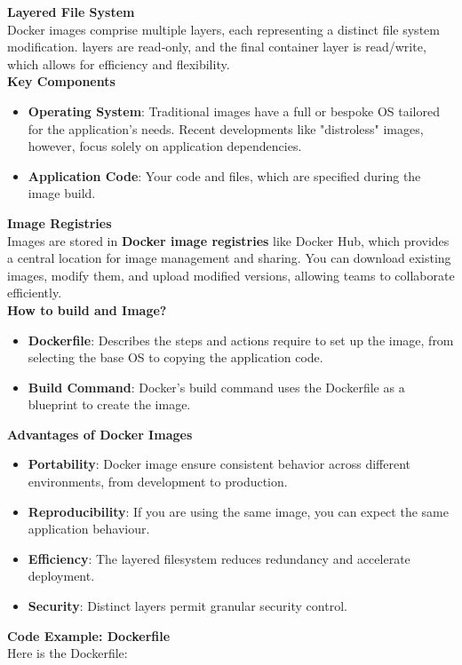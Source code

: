 \documentclass{article}
\begin{document}
\textbf{Layered File System} \\
Docker images comprise multiple layers, each representing a distinct file system modification. layers are read-only, and the final container layer is read/write, which allows for efficiency and flexibility. \\   
\textbf{Key Components} \\
\begin{itemize}
\color{blue}
\item \textbf{Operating System}: Traditional images have a full or bespoke OS tailored for the application's needs. Recent developments like "distroless" images, however, focus solely on application dependencies. 
\item \textbf{Application Code}: Your code and files, which are specified during the image build.
\end{itemize}
\textbf{Image Registries} \\
Images are stored in \textbf{Docker image registries} like Docker Hub, which provides a central location for image management and sharing. You can download existing images, modify them, and upload modified versions, allowing teams to collaborate efficiently. \\
\textbf{How to build and Image?} \\
\begin{itemize}
\color{blue}
\item \textbf{Dockerfile}: Describes the steps and actions require to set up the image, from selecting the base OS to copying the application code.
\item \textbf{Build Command}: Docker's build command uses the Dockerfile as a blueprint to create the image.
\end{itemize}
\textbf{Advantages of Docker Images} \\
\begin{itemize}
\color{blue}
\item \textbf{Portability}: Docker image ensure consistent behavior across different environments, from development to production.
\item \textbf{Reproducibility}: If you are using the same image, you can expect the same application behaviour.
\item \textbf{Efficiency}: The layered filesystem reduces redundancy and accelerate deployment. 
\item \textbf{Security}: Distinct layers permit granular security control. 
\end{itemize}
\textbf{Code Example: Dockerfile} \\
Here is the Dockerfile: \\
\end{document}

